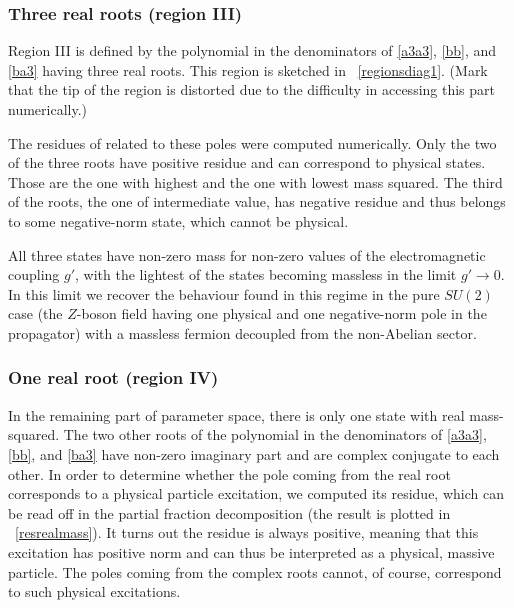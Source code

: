 \subsubsection{Three real roots (region III)}




Region III is defined by the polynomial in the denominators of \eqref{a3a3}, \eqref{bb}, and \eqref{ba3} having three real roots. This region is sketched in \figurename\ \ref{regionsdiag1}. (Mark that the tip of the region is distorted due to the difficulty in accessing this part numerically.) 


The residues of related to these poles were computed numerically. Only the two of the three roots have positive residue and can correspond to physical states. Those are the one with highest and the one with lowest mass squared. The third of the roots, the one of intermediate value, has negative residue and thus belongs to some negative-norm state, which cannot be physical.

All three states have non-zero mass for non-zero values of the electromagnetic coupling $g'$, with the lightest of the states becoming massless in the limit $g'\to0$. In this limit we recover the behaviour found in this regime in the pure $SU(2)$ case \cite{Capri:2012cr} (the $Z$-boson field having one physical and one negative-norm pole in the propagator) with a massless fermion decoupled from the non-Abelian sector.






\subsubsection{One real root (region IV)}
In the remaining part of parameter space, there is only one state with real mass-squared. The two other roots of the polynomial in the denominators of \eqref{a3a3}, \eqref{bb}, and \eqref{ba3} have non-zero imaginary part and are complex conjugate to each other. In order to determine whether the pole coming from the real root corresponds to a physical particle excitation, we computed its residue, which can be read off in the partial fraction decomposition (the result is plotted in \figurename\ \ref{resrealmass}). It turns out the residue is always positive, meaning that this excitation has positive norm and can thus be interpreted as a physical, massive particle. The poles coming from the complex roots cannot, of course, correspond to such physical excitations.

